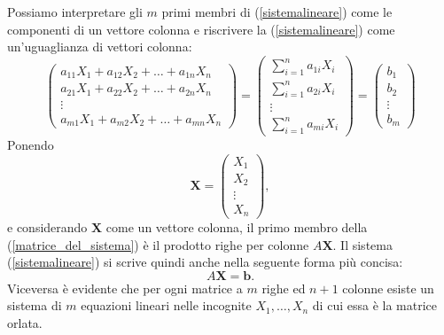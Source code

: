 \documentclass{article}
\theoremstyle{plain}
\theoremstyle{definition}
\theoremstyle{remark}
\begin{document}
Possiamo interpretare gli \( m \) primi membri di (\ref{sistemalineare}) come le componenti di un vettore colonna e riscrivere la (\ref{sistemalineare}) come un'uguaglianza di vettori colonna:
\begin{equation}
    \begin{pmatrix}
        a_{11}X_{1} + a_{12}X_{2} + \ldots + a_{1n}X_{n} \\
        a_{21}X_{1} + a_{22}X_{2} + \ldots + a_{2n}X_{n} \\
        \vdots \\
        a_{m1}X_{1} + a_{m2}X_{2} + \ldots + a_{mn}X_{n}
    \end{pmatrix} = 
    \begin{pmatrix}
        \sum\limits_{i=1}^{n}a_{1i}X_i \\[3mm]
        \sum\limits_{i=1}^{n}a_{2i}X_i \\[3mm]
        \vdots \\
        \sum\limits_{i=1}^{n}a_{mi}X_i
    \end{pmatrix} = 
    \begin{pmatrix}
        b_{1} \\
        b_{2} \\
        \vdots \\
        b_{m}
    \end{pmatrix}\label{matrice_del_sistema}
\end{equation}
Ponendo
\[
    \mathbf{X} = \begin{pmatrix}
        X_{1} \\
        X_{2} \\
        \vdots \\
        X_{n}
    \end{pmatrix},
\]
e considerando \( \mathbf{X} \) come un vettore colonna, il primo membro della (\ref{matrice_del_sistema}) è il prodotto righe per colonne \( A\mathbf{X} \).
Il sistema (\ref{sistemalineare}) si scrive quindi anche nella seguente forma più concisa:
\begin{equation}
    A\mathbf{X} = \mathbf{b}.\label{axugualeb}
\end{equation}
Viceversa è evidente che per ogni matrice a \( m \) righe ed \( n+1 \) colonne esiste un sistema di \( m \) equazioni lineari nelle incognite \( X_1, \ldots, X_n \) di cui essa è la matrice orlata.

\vspace{10pt}
\end{document}
